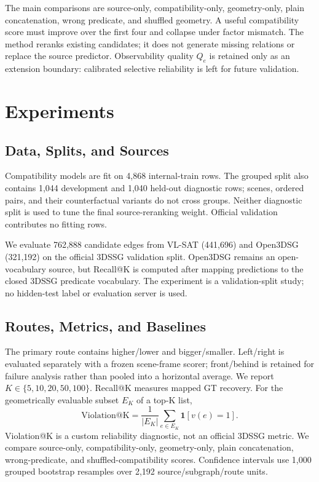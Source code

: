\documentclass[letterpaper]{article} %
\newcommand{\Qe}{\ensuremath{Q_e}}
\begin{document}
The main comparisons are source-only, compatibility-only, geometry-only, plain
concatenation, wrong predicate, and shuffled geometry. A useful compatibility
score must improve over the first four and collapse under factor mismatch. The
method reranks existing candidates; it does not generate missing relations or
replace the source predictor. Observability quality $\Qe$ is retained only as
an extension boundary: calibrated selective reliability is left for future
validation.

\section{Experiments}

\subsection{Data, Splits, and Sources}

Compatibility models are fit on 4,868 internal-train rows. The grouped split
also contains 1,044 development and 1,040 held-out diagnostic rows; scenes,
ordered pairs, and their counterfactual variants do not cross groups. Neither
diagnostic split is used to tune the final source-reranking weight. Official
validation contributes no fitting rows.

We evaluate 762,888 candidate edges from VL-SAT (441,696) and Open3DSG
(321,192) on the official 3DSSG validation split. Open3DSG remains an
open-vocabulary source, but Recall@K is computed after mapping predictions to
the closed 3DSSG predicate vocabulary. The experiment is a validation-split
study; no hidden-test label or evaluation server is used.

\subsection{Routes, Metrics, and Baselines}

The primary route contains higher/lower and bigger/smaller. Left/right is
evaluated separately with a frozen scene-frame scorer; front/behind is retained
for failure analysis rather than pooled into a horizontal average. We report
$K\in\{5,10,20,50,100\}$. Recall@K measures mapped GT recovery. For the
geometrically evaluable subset $E_K$ of a top-K list,
\[
\mathrm{Violation@K}=\frac{1}{|E_K|}
\sum_{e\in E_K}\mathbf{1}[v(e)=1].
\]
Violation@K is a custom reliability diagnostic, not an official 3DSSG metric.
We compare source-only, compatibility-only, geometry-only, plain concatenation,
wrong-predicate, and shuffled-compatibility scores. Confidence intervals use
1,000 grouped bootstrap resamples over 2,192 source/subgraph/route units.
\end{document}
